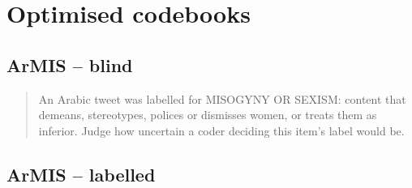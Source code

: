 \section{Optimised codebooks}
\label{app:codebooks}
\subsection*{ArMIS -- blind}
\begin{quote}\small
An Arabic tweet was labelled for MISOGYNY OR SEXISM: content that demeans, stereotypes, polices or dismisses women, or treats them as inferior. Judge how uncertain a coder deciding this item's label would be.
\end{quote}
\subsection*{ArMIS -- labelled}
